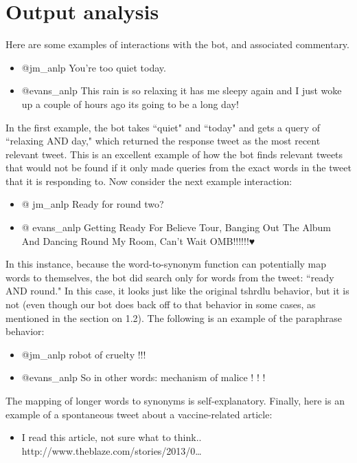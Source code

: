 \documentclass[11pt]{article}
\begin{document}
\section{Output analysis}

Here are some examples of interactions with the bot, and associated commentary.

\begin{itemize}
\item {@}jm\_anlp You're too quiet today.
\item {@}evans\_anlp This rain is so relaxing it has me sleepy again and I just woke up a couple of hours ago its going to be a long day!
\end {itemize}

In the first example, the bot takes ``quiet" and ``today" and gets a query of ``relaxing AND day," which returned the response tweet as the most recent relevant tweet. This is an excellent example of how the bot finds relevant tweets that would not be found if it only made queries from the exact words in the tweet that it is responding to. Now consider the next example interaction:

\begin{itemize}
\item {@} jm\_anlp Ready for round two?
\item {@} evans\_anlp Getting Ready For Believe Tour, Banging Out The Album And Dancing Round My Room, Can't Wait OMB!!!!!!♥
\end {itemize}

In this instance, because the word-to-synonym function can potentially map words to themselves, the bot did search only for words from the tweet: ``ready AND round." In this case, it looks just like the original tshrdlu behavior, but it is not (even though our bot does back off to that behavior in some cases, as mentioned in the section on 1.2). The following is an example of the paraphrase behavior:

\begin{itemize}
\item {@}jm\_anlp robot of cruelty !!!
\item {@}evans\_anlp So in other words: mechanism of malice ! ! !
\end {itemize}

The mapping of longer words to synonyms is self-explanatory. Finally, here is an example of a spontaneous tweet about a vaccine-related article:

\begin{itemize}
\item I read this article, not sure what to think.. http://www.theblaze.com/stories/2013/0…
\end{itemize}
\end{document}
